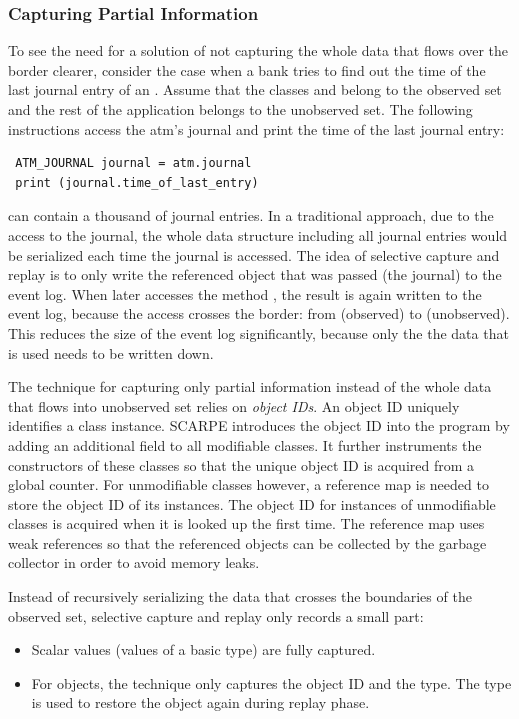 \subsubsection{Capturing Partial Information}
To see the need for a solution of not capturing the whole data that flows over the border clearer, consider the case when a bank tries to find out the time of the last journal entry of an . Assume that the classes  and  belong to the observed set and the rest of the application belongs to the unobserved set. The following instructions access the atm's journal and print the time of the last journal entry:

\javalisting
\begin{lstlisting}
 ATM_JOURNAL journal = atm.journal
 print (journal.time_of_last_entry)
\end{lstlisting}

 can contain a thousand of journal entries. In a traditional approach, due to the access to the journal, the whole data structure including all journal entries would be serialized each time the journal is accessed. The idea of selective capture and replay is to only write the referenced object that was passed (the journal) to the event log. When later  accesses the method , the result is again written to the event log, because the access crosses the border: from  (observed) to  (unobserved). This reduces the size of the event log significantly, because only the the data that is used needs to be written down.

The technique for capturing only partial information instead of the whole data that flows into unobserved set relies on \emph{object IDs}. An object ID uniquely identifies a class instance. SCARPE introduces the object ID into the program by adding an additional field to all modifiable classes. It further instruments the constructors of these classes so that the unique object ID is acquired from a global counter. For unmodifiable classes however, a reference map is needed to store the object ID of its instances. The object ID for instances of unmodifiable classes is acquired when it is looked up the first time. The reference map uses weak references so that the referenced objects can be collected by the garbage collector in order to avoid memory leaks.

Instead of recursively serializing the data that crosses the boundaries of the observed set, selective capture and replay only records a small part:
\begin{itemize}
 \item Scalar values (values of a basic type) are fully captured.
 \item For objects, the technique only captures the object ID and the type. The type is used to restore the object again during replay phase.
\end{itemize}

